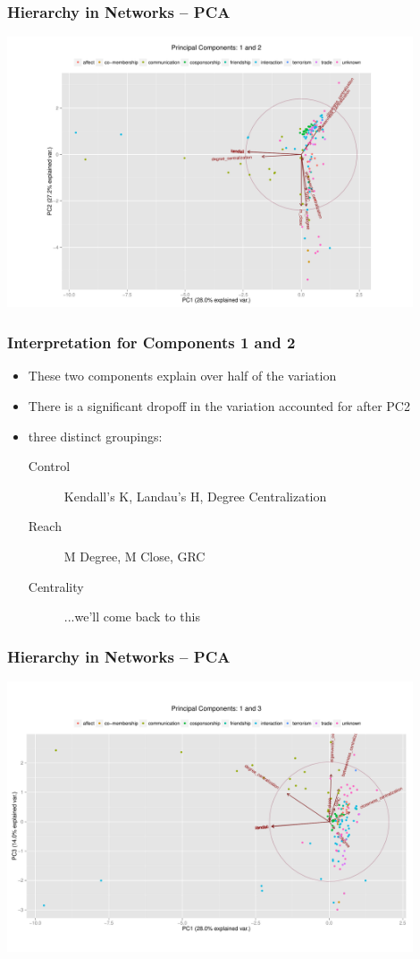 \documentclass{beamer}
\newenvironment{changemargin}[2]{%
	\begin{list}{}{%
			\setlength{\topsep}{0pt}%
			\setlength{\leftmargin}{#1}%
			\setlength{\rightmargin}{#2}%
			\setlength{\listparindent}{\parindent}%
			\setlength{\itemindent}{\parindent}%
			\setlength{\parsep}{\parskip}%
		}%
		\item[]}{\end{list}}
\begin{document}
\begin{frame}\frametitle{Hierarchy in Networks -- PCA}
	\begin{changemargin}{-2cm}{ -2cm}
		\centering
		\includegraphics[width=12cm, height=8cm]{images/Observed_PCA_Components1_2.pdf}
	\end{changemargin}
\end{frame}

\begin{frame}\frametitle{Interpretation for Components 1 and 2}
	\begin{itemize}
		\item These two components explain over half of the variation
		\item There is a significant dropoff in the variation accounted for after PC2
		\vskip 1cm
		\item three distinct groupings:
		\begin{description}
			\item[Control] Kendall's K, Landau's H, Degree Centralization
			\item[Reach] M Degree, M Close, GRC
			\item[Centrality] ...we'll come back to this
		\end{description}
	\end{itemize}
\end{frame}

\begin{frame}\frametitle{Hierarchy in Networks -- PCA}
	\begin{changemargin}{-2cm}{ -2cm}
		\centering
		\includegraphics[width=12cm, height=8cm]{images/Observed_PCA_Components1_3.pdf}
	\end{changemargin}
\end{frame}
\end{document}

